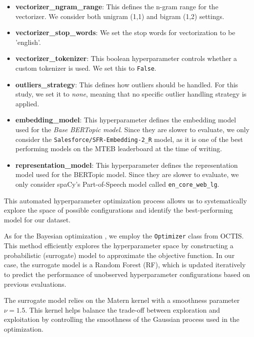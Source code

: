 \begin{itemize}
    \item \textbf{vectorizer\_ngram\_range}: This defines the n-gram range for the vectorizer. We consider both unigram (1,1) and bigram (1,2) settings.
    \item \textbf{vectorizer\_stop\_words}: We set the stop words for vectorization to be 'english'.
    \item \textbf{vectorizer\_tokenizer}: This boolean hyperparameter controls whether a custom tokenizer is used. We set this to \texttt{False}.
    \item \textbf{outliers\_strategy}: This defines how outliers should be handled. For this study, we set it to \textit{none}, meaning that no specific outlier handling strategy is applied.
    \item \textbf{embedding\_model}: This hyperparameter defines the embedding model used for the \textit{Base BERTopic model}. Since they are slower to evaluate, we only consider the \texttt{Salesforce/\allowbreak SFR-Embedding-2\allowbreak\_R} \cite{noauthor_salesforcesfr-embedding-2_r_2024} model, as it is one of the best performing models on the MTEB leaderboard \cite{muennighoff_mteb_2023} at the time of writing.
    \item \textbf{representation\_model}: This hyperparameter defines the representation model used for the BERTopic model. Since they are slower to evaluate, we only consider spaCy's Part-of-Speech model called \texttt{en\_core\_web\_lg}.
\end{itemize}

This automated hyperparameter optimization process allows us to systematically explore the space of possible configurations and identify the best-performing model for our dataset.

As for the Bayesian optimization \cite{archetti_bayesian_2019, galuzzi_hyperparameter_2020, snoek_practical_2012}, we employ the \texttt{Optimizer} class from OCTIS. This method efficiently explores the hyperparameter space by constructing a probabilistic (surrogate) model to approximate the objective function. In our case, the surrogate model is a Random Forest (RF), which is updated iteratively to predict the performance of unobserved hyperparameter configurations based on previous evaluations.

The surrogate model relies on the Matern kernel with a smoothness parameter \( \nu = 1.5 \). This kernel helps balance the trade-off between exploration and exploitation by controlling the smoothness of the Gaussian process used in the optimization.

